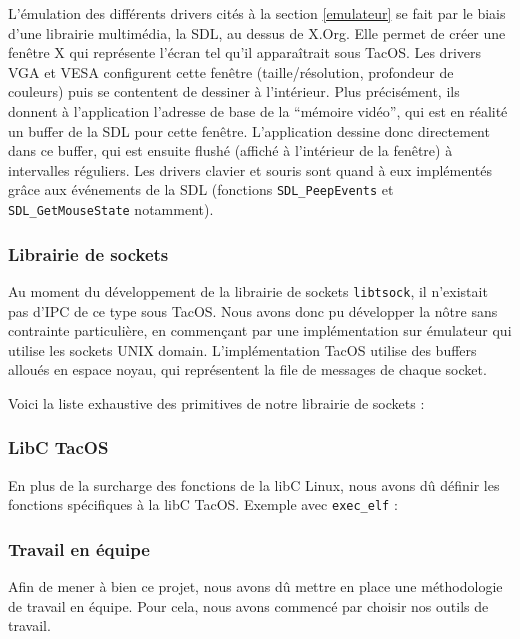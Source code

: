 L'émulation des différents drivers cités à la section \ref{emulateur} se fait par le biais d'une librairie multimédia, la SDL, au dessus de X.Org.
Elle permet de créer une fenêtre X qui représente l'écran tel qu'il apparaîtrait sous TacOS. Les drivers VGA et VESA configurent cette fenêtre (taille/résolution, profondeur de couleurs) puis se contentent de dessiner à l'intérieur. Plus précisément, ils donnent à l'application l'adresse de base de la ``mémoire vidéo'', qui est en réalité un buffer de la SDL pour cette fenêtre. L'application dessine donc directement dans ce buffer, qui est ensuite flushé (affiché à l'intérieur de la fenêtre) à intervalles réguliers.
Les drivers clavier et souris sont quand à eux implémentés grâce aux événements de la SDL (fonctions \verb|SDL_PeepEvents| et \verb|SDL_GetMouseState| notamment). 

\subsubsection{Librairie de sockets}

Au moment du développement de la librairie de sockets \verb|libtsock|, il n'existait pas d'IPC de ce type sous TacOS. Nous avons donc pu développer la nôtre sans contrainte particulière, en commençant par une implémentation sur émulateur qui utilise les sockets UNIX domain. L'implémentation TacOS utilise des buffers alloués en espace noyau, qui représentent la file de messages de chaque socket.

Voici la liste exhaustive des primitives de notre librairie de sockets :



\subsubsection{LibC TacOS}

En plus de la surcharge des fonctions de la libC Linux, nous avons dû définir les fonctions spécifiques à la libC TacOS. Exemple avec \verb|exec_elf| :


\subsubsection{Travail en équipe}

Afin de mener à bien ce projet, nous avons dû mettre en place une méthodologie de travail en équipe.
Pour cela, nous avons commencé par choisir nos outils de travail.

